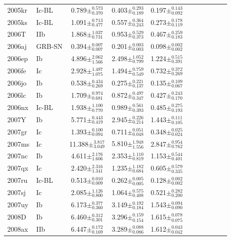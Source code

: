 \documentclass[a4paper,fleqn,usenatbib]{mnras}
\begin{document}
\begin{table}
\begin{minipage}{140mm}
\begin{tabular}{@{}llcccccclcc@{}}
2005kr & Ic-BL & 0.789$ \pm^{0.573}_{0.370}$ &0.403$ \pm^{0.293}_{0.189}$ &0.197$ \pm^{0.143}_{0.092}$ \\
2005ks & Ic-BL & 1.091$ \pm^{0.713}_{0.477}$ &0.557$ \pm^{0.364}_{0.243}$ &0.273$ \pm^{0.178}_{0.119}$ \\
2006T & IIb & 1.868$ \pm^{1.037}_{0.731}$ &0.953$ \pm^{0.529}_{0.373}$ &0.467$ \pm^{0.259}_{0.183}$ \\
2006aj & GRB-SN & 0.394$ \pm^{0.007}_{0.007}$ &0.201$ \pm^{0.003}_{0.003}$ &0.098$ \pm^{0.002}_{0.002}$ \\
2006ep & Ib & 4.896$ \pm^{2.062}_{1.566}$ &2.498$ \pm^{1.052}_{0.799}$ &1.224$ \pm^{0.515}_{0.391}$ \\
2006fe & Ic & 2.928$ \pm^{1.487}_{1.075}$ &1.494$ \pm^{0.759}_{0.549}$ &0.732$ \pm^{0.372}_{0.269}$ \\
2006jo & Ib & 0.538$ \pm^{0.434}_{0.269}$ &0.275$ \pm^{0.221}_{0.137}$ &0.135$ \pm^{0.109}_{0.067}$ \\
2006lc & Ib & 1.709$ \pm^{0.974}_{0.681}$ &0.872$ \pm^{0.497}_{0.347}$ &0.427$ \pm^{0.243}_{0.170}$ \\
2006nx & Ic-BL & 1.938$ \pm^{1.100}_{0.770}$ &0.989$ \pm^{0.561}_{0.393}$ &0.485$ \pm^{0.275}_{0.193}$ \\
2007Y & Ib & 5.771$ \pm^{0.443}_{0.419}$ &2.945$ \pm^{0.226}_{0.214}$ &1.443$ \pm^{0.111}_{0.105}$ \\
2007gr & Ic & 1.393$ \pm^{0.100}_{0.094}$ &0.711$ \pm^{0.051}_{0.048}$ &0.348$ \pm^{0.025}_{0.024}$ \\
2007ms & Ic & 11.388$ \pm^{3.817}_{3.049}$ &5.810$ \pm^{1.948}_{1.556}$ &2.847$ \pm^{0.954}_{0.762}$ \\
2007nc & Ib & 4.611$ \pm^{2.176}_{1.606}$ &2.353$ \pm^{1.110}_{0.819}$ &1.153$ \pm^{0.544}_{0.401}$ \\
2007qx & Ic & 2.420$ \pm^{2.316}_{1.341}$ &1.235$ \pm^{1.182}_{0.684}$ &0.605$ \pm^{0.579}_{0.335}$ \\
2007ru & Ic-BL & 0.513$ \pm^{0.010}_{0.009}$ &0.262$ \pm^{0.005}_{0.005}$ &0.128$ \pm^{0.002}_{0.002}$ \\
2007sj & Ic & 2.085$ \pm^{1.126}_{0.800}$ &1.064$ \pm^{0.575}_{0.408}$ &0.521$ \pm^{0.282}_{0.200}$ \\
2007uy & Ib & 6.173$ \pm^{0.377}_{0.360}$ &3.149$ \pm^{0.192}_{0.184}$ &1.543$ \pm^{0.094}_{0.090}$ \\
2008D & Ib & 6.460$ \pm^{0.312}_{0.301}$ &3.296$ \pm^{0.159}_{0.154}$ &1.615$ \pm^{0.078}_{0.075}$ \\
2008ax & IIb & 6.447$ \pm^{0.172}_{0.169}$ &3.289$ \pm^{0.088}_{0.086}$ &1.612$ \pm^{0.043}_{0.042}$ \\

\end{tabular}
\end{minipage}
\end{table}
\end{document}
